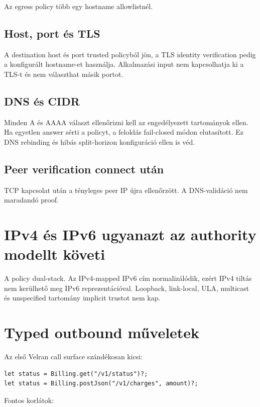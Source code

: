 Az egress policy több egy hostname allowlistnél.

\subsection*{Host, port és TLS}

A destination host és port trusted policyból jön, a TLS identity verification pedig a konfigurált hostname-et használja. Alkalmazási input nem kapcsolhatja ki a TLS-t és nem választhat másik portot.

\subsection*{DNS és CIDR}

Minden A és AAAA választ ellenőrizni kell az engedélyezett tartományok ellen. Ha egyetlen answer sérti a policyt, a feloldás fail-closed módon elutasított. Ez DNS rebinding és hibás split-horizon konfiguráció ellen is véd.

\subsection*{Peer verification connect után}

TCP kapcsolat után a tényleges peer IP újra ellenőrzött. A DNS-validáció nem maradandó proof.

\section{IPv4 és IPv6 ugyanazt az authority modellt követi}

A policy dual-stack. Az IPv4-mapped IPv6 cím normalizálódik, ezért IPv4 tiltás nem kerülhető meg IPv6 reprezentációval. Loopback, link-local, ULA, multicast és unspecified tartomány implicit trustot nem kap.

\section{Typed outbound műveletek}

Az első Velran call surface szándékosan kicsi:

\begin{lstlisting}[language=Velran]
let status = Billing.get("/v1/status")?;
let status = Billing.postJson("/v1/charges", amount)?;
\end{lstlisting}

Fontos korlátok:


